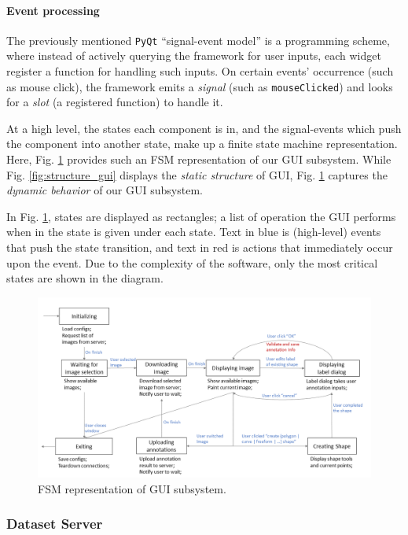 \paragraph{Event processing} The previously mentioned \texttt{PyQt} ``signal-event model'' is a programming scheme, where instead of actively querying the framework for user inputs, each widget register a function for handling such inputs. On certain events' occurrence (such as mouse click), the framework emits a \textit{signal} (such as \texttt{mouseClicked}) and looks for a \textit{slot} (a registered function) to handle it. 

At a high level, the states each component is in, and the signal-events which push the component into another state, make up a finite state machine representation. Here, Fig. \ref{fig:fsm_gui} provides such an FSM representation of our GUI subsystem. While Fig. \ref{fig:structure_gui} displays the \textit{static structure} of GUI, Fig. \ref{fig:fsm_gui} captures the \textit{dynamic behavior} of our GUI subsystem.

In Fig. \ref{fig:fsm_gui}, states are displayed as rectangles; a list of operation the GUI performs when in the state is given under each state. Text in blue is (high-level) events that push the state transition, and text in red is actions that immediately occur upon the event. Due to the complexity of the software, only the most critical states are shown in the diagram.

\begin{figure}[htbp!]
    \centering
    \includegraphics[width=\textwidth]{figures/fsm1.png}
    \caption{FSM representation of GUI subsystem.}
    \label{fig:fsm_gui}
\end{figure}

\subsubsection{Dataset Server}

